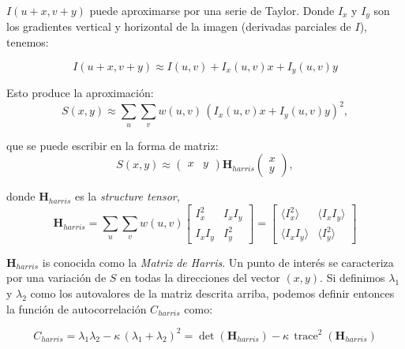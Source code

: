 $I(u + x, v + y)$ puede aproximarse por una serie de Taylor. Donde $I_x$ y $I_y$ son los gradientes vertical y horizontal de la imagen (derivadas parciales de $I$), tenemos:

\begin{equation}
  I(u+x,v+y) \approx I(u,v) + I_x(u,v)x+I_y(u,v)y
\end{equation}

Esto produce la aproximación:
\begin{equation}
  S(x,y) \approx \sum_u \sum_v w(u,v) \, \left( I_x(u,v)x + I_y(u,v)y \right)^2,
\end{equation}

que se puede escribir en la forma de matriz:
\begin{equation}
  S(x,y) \approx \begin{pmatrix} x & y \end{pmatrix} \textbf{H}_{harris} \begin{pmatrix} x \\ y \end{pmatrix},
\end{equation}

donde  $\textbf{H}_{harris}$ es la \emph{structure tensor},
\begin{equation}
  \textbf{H}_{harris} = \sum_u \sum_v w(u,v) 
  \begin{bmatrix}
    I_x^2 & I_x I_y \\
    I_x I_y & I_y^2 
  \end{bmatrix}
  =
  \begin{bmatrix}
    \langle I_x^2 \rangle & \langle I_x I_y \rangle\\
    \langle I_x I_y \rangle & \langle I_y^2 \rangle
  \end{bmatrix}
\end{equation}

$\textbf{H}_{harris}$ is conocida como la \emph{Matriz de Harris}. Un punto de interés se caracteriza por una variación de $S$ en todas la direcciones del vector $(x,y)$. Si definimos $\lambda_1$ y $\lambda_2$  como los autovalores de la matriz descrita arriba, podemos definir entonces la función de autocorrelación $C_{harris}$  como:

\begin{equation}
  C_{harris} = \lambda_1 \lambda_2 - \kappa \, (\lambda_1 + \lambda_2)^2 = \operatorname{det}(\textbf{H}_{harris}) - \kappa \, \operatorname{trace}^2(\textbf{H}_{harris})
\end{equation}

